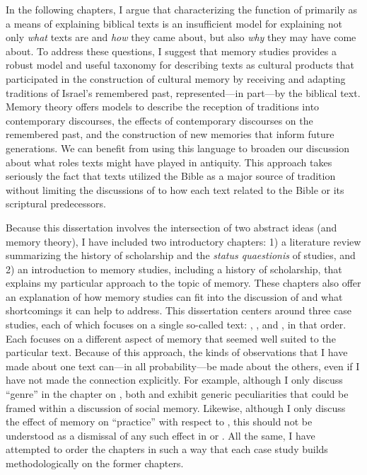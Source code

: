 In the following chapters, I argue that characterizing the function of \rwb primarily as a means of explaining biblical texts is an insufficient model for explaining not only \emph{what} \rwb texts are and \emph{how} they came about, but also \emph{why} they may have come about. To address these questions, I suggest that memory studies provides a robust model and useful taxonomy for describing \rwb texts as cultural products that participated in the construction of cultural memory by receiving and adapting traditions of Israel's remembered past, represented---in part---by the biblical text. Memory theory offers models to describe the reception of traditions into contemporary discourses, the effects of contemporary discourses on the remembered past, and the construction of new memories that inform future generations. We can benefit from using this language to broaden our discussion about what roles \rwb texts might have played in antiquity. This approach takes seriously the fact that \rwb texts utilized the Bible as a major source of tradition without limiting the discussions of \rwb to how each text related to the Bible or its scriptural predecessors.



Because this dissertation involves the intersection of two abstract ideas (\rwb and memory theory), I have included two introductory chapters: 1) a literature review summarizing the history of scholarship and the \emph{status quaestionis} of \rwb studies, and 2) an introduction to memory studies, including a history of scholarship, that explains my particular approach to the topic of memory. These chapters also offer an explanation of how memory studies can fit into the discussion of \rwb and what shortcomings it can help to address. This dissertation centers around three case studies, each of which focuses on a single so-called \rwb text: \chronicles, \ga, and \jub, in that order. Each focuses on a different aspect of memory that seemed well suited to the particular text. Because of this approach, the kinds of observations that I have made about one text can---in all probability---be made about the others, even if I have not made the connection explicitly. For example, although I only discuss ``genre'' in the chapter on \ga, both \chronicles and \jub exhibit generic peculiarities that could be framed within a discussion of social memory. Likewise, although I only discuss the effect of memory on ``practice'' with respect to \jub, this should not be understood as a dismissal of any such effect in \chronicles or \ga. All the same, I have attempted to order the chapters in such a way that each case study builds methodologically on the former chapters.

